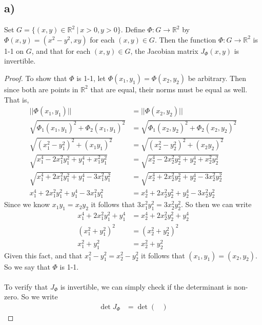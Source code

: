 \documentclass{article}
\theoremstyle{definition}
\begin{document}
\subsection*{a)}
\begin{mdframed}[]
    Set $G = \{(x,y) \in \mathbb{R}^2 \ | \ x > 0, y > 0\}$. Define $\Phi : G \rightarrow \mathbb{R}^2$ by $\Phi(x,y) = (x^2 - y^2, xy)$ for 
    each $(x,y) \in G$. Then the function $\Phi : G \rightarrow \mathbb{R}^2$ is 1-1 on $G$, and that for each $(x,y) \in G$,
    the Jacobian matrix $J_\Phi(x,y)$ is invertible.
\end{mdframed}
\begin{proof}
    To show that $\Phi$ is 1-1, let $\Phi(x_1,y_1) = \Phi(x_2,y_2)$ be arbitrary.
    Then since both are points in $\mathbb{R}^2$ that are equal, their norms must be equal as well. That is,
    \begin{align*}
        ||\Phi(x_1,y_1)|| &= ||\Phi(x_2,y_2)||\\
        \sqrt{\Phi_1(x_1,y_1)^2 + \Phi_2(x_1,y_1)^2} &= \sqrt{\Phi_1(x_2,y_2)^2 + \Phi_2(x_2,y_2)^2}\\
        \sqrt{(x_1^2-y_1^2)^2 + (x_1y_1)^2} &= \sqrt{(x_2^2-y_2^2)^2 + (x_2y_2)^2} \\
        \sqrt{x_1^4 - 2x_1^2y_1^2 + y_1^4 + x_1^2y_1^2} &= \sqrt{x_2^4 - 2x_2^2y_2^2 + y_2^4 + x_2^2y_2^2}\\
        \sqrt{x_1^4 + 2x_1^2y_1^2 + y_1^4 - 3x_1^2y_1^2} &= \sqrt{x_2^4 + 2x_2^2y_2^2 + y_2^4 - 3x_2^2y_2^2}\\
        x_1^4 + 2x_1^2y_1^2 + y_1^4 - 3x_1^2y_1^2 & = x_2^4 + 2x_2^2y_2^2 + y_2^4 - 3x_2^2y_2^2
    \end{align*}
    Since we know $x_1y_1 = x_2y_2$ it follows that $3x_1^2y_1^2 = 3x_2^2y_2^2$. So then we can write 
    \begin{align*}
        x_1^4 + 2x_1^2y_1^2 + y_1^4 & = x_2^4 + 2x_2^2y_2^2 + y_2^4 \\
        (x_1^2 + y_1^2)^2 &= (x_2^2 + y_2^2)^2 \\
        x_1^2 + y_1^2 &= x_2^2 + y_2^2
    \end{align*}
Given this fact, and that $x_1^2 - y_1^2 = x_2^2 - y_2^2$ it follows that $(x_1,y_1) = (x_2,y_2)$. So we say that $\Phi$ is 1-1.\\\\
To verify that $J_\Phi$ is invertible, we can simply check if the determinant is non-zero. So we write 
\begin{align*}
    \det J_\Phi & = \det \begin{pmatrix}

\end{pmatrix}
\end{align*}
\end{proof}
\end{document}
